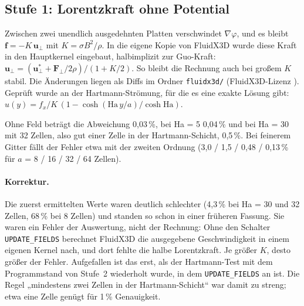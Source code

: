 \subsection*{Stufe 1: Lorentzkraft ohne Potential}
Zwischen zwei unendlich ausgedehnten Platten verschwindet $\nabla\varphi$, und es bleibt
$\mathbf{f} = -K\,\mathbf{u}_\perp$ mit $K = \sigma B^2/\rho$. In die eigene Kopie von FluidX3D wurde diese Kraft in den
Hauptkernel eingebaut, halbimplizit zur Guo-Kraft: $\mathbf{u}_\perp = (\mathbf{u}^*_\perp + \mathbf{F}_\perp/2\rho)/(1+K/2)$.
So bleibt die Rechnung auch bei großem $K$ stabil. Die Änderungen liegen als Diffs im Ordner \texttt{fluidx3d/}
(FluidX3D-Lizenz \cite{fluidx3d}). Geprüft wurde an der Hartmann-Strömung, für die es eine exakte Lösung gibt:
$u(y) = f_x/K\,(1-\cosh(\mathrm{Ha}\,y/a)/\cosh\mathrm{Ha})$.


Ohne Feld beträgt die Abweichung 0,03\,\%, bei Ha = 5 0,04\,\% und bei Ha = 30 mit 32 Zellen, also gut einer Zelle
in der Hartmann-Schicht, 0,5\,\%. Bei feinerem Gitter fällt der Fehler etwa mit der zweiten Ordnung (3,0 / 1,5 / 0,48
/ 0,13\,\% für $a$ = 8 / 16 / 32 / 64 Zellen).

\paragraph{Korrektur.} Die zuerst ermittelten Werte waren deutlich schlechter (4,3\,\% bei Ha = 30 und 32 Zellen,
68\,\% bei 8 Zellen) und standen so schon in einer früheren Fassung. Sie waren ein Fehler der Auswertung, nicht der
Rechnung: Ohne den Schalter \texttt{UPDATE\_FIELDS} berechnet FluidX3D die ausgegebene Geschwindigkeit in einem
eigenen Kernel nach, und dort fehlte die halbe Lorentzkraft. Je größer $K$, desto größer der Fehler. Aufgefallen ist
das erst, als der Hartmann-Test mit dem Programmstand von Stufe~2 wiederholt wurde, in dem \texttt{UPDATE\_FIELDS} an
ist. Die Regel „mindestens zwei Zellen in der Hartmann-Schicht“ war damit zu streng; etwa eine Zelle genügt für
1\,\% Genauigkeit.

